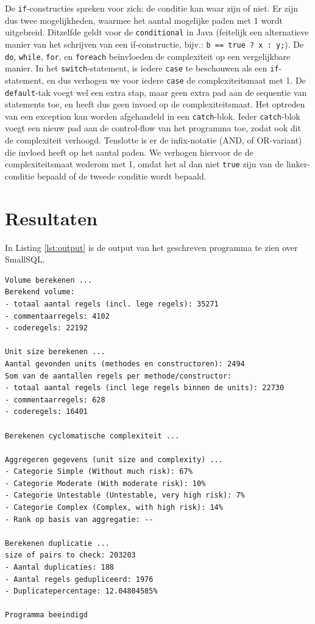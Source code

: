 \documentclass[a4paper]{article}
\begin{document}
De \texttt{if}-constructies spreken voor zich: de conditie kan
waar zijn of niet. Er zijn dus twee mogelijkheden, waarmee het
aantal mogelijke paden met 1 wordt uitgebreid. Ditzelfde geldt
voor de \texttt{conditional} in Java (feitelijk een alternatieve
manier van het schrijven van een if-constructie, bijv.:
\texttt{b == true ? x : y;}). De \texttt{do}, \texttt{while},
\texttt{for}, en \texttt{foreach} be\"invloeden de complexiteit
op een vergelijkbare manier. In het \texttt{switch}-statement,
is iedere \texttt{case} te beschouwen als een
\texttt{if}-statement, en dus verhogen we voor iedere
\texttt{case} de complexiteitsmaat met 1.
De \texttt{default}-tak voegt wel een extra stap, maar geen
extra pad aan de sequentie van statements toe, en heeft dus geen
invoed op de complexiteitsmaat.
Het optreden van een exception kan worden afgehandeld in een
\texttt{catch}-blok. Ieder \texttt{catch}-blok voegt een nieuw
pad aan de control-flow van het programma toe, zodat ook dit de
complexiteit verhoogd.
Tenslotte is er de infix-notatie (AND, of OR-variant) die
invloed heeft op het aantal paden. We verhogen hiervoor de de
complexiteitsmaat wederom met 1, omdat het al dan niet
\texttt{true} zijn van de linker-conditie bepaald of de tweede
conditie wordt bepaald.



\section{Resultaten}
In Listing \ref{lst:output} is de output van het geschreven programma te zien over SmallSQL. 

\begin{lstlisting}[caption={Programma output SmallSQL},label={lst:output},frame = single]
Volume berekenen ...
Berekend volume: 
- totaal aantal regels (incl. lege regels): 35271
- commentaarregels: 4102
- coderegels: 22192

Unit size berekenen ...
Aantal gevonden units (methodes en constructoren): 2494
Som van de aantallen regels per methode/constructor:
- totaal aantal regels (incl lege regels binnen de units): 22730
- commentaarregels: 628
- coderegels: 16401

Berekenen cyclomatische complexiteit ...

Aggregeren gegevens (unit size and complexity) ...
- Categorie Simple (Without much risk): 67%
- Categorie Moderate (With moderate risk): 10%
- Categorie Untestable (Untestable, very high risk): 7%
- Categorie Complex (Complex, with high risk): 14%
- Rank op basis van aggregatie: --

Berekenen duplicatie ...
size of pairs to check: 203203
- Aantal duplicaties: 188
- Aantal regels gedupliceerd: 1976
- Duplicatepercentage: 12.04804585%

Programma beeindigd
\end{lstlisting}
 
\end{document}
